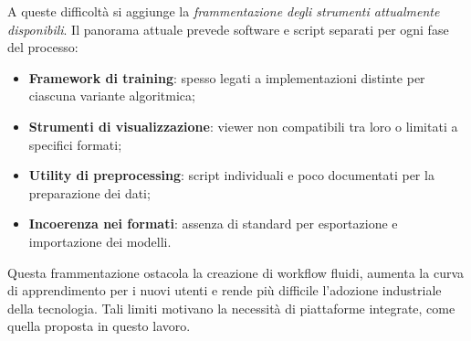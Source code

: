 A queste difficoltà si aggiunge la \textit{frammentazione degli strumenti attualmente disponibili}. Il panorama attuale prevede software e script separati per ogni fase del processo:
\begin{itemize}
    \item \textbf{Framework di training}: spesso legati a implementazioni distinte per ciascuna variante algoritmica;
    \item \textbf{Strumenti di visualizzazione}: viewer non compatibili tra loro o limitati a specifici formati;
    \item \textbf{Utility di preprocessing}: script individuali e poco documentati per la preparazione dei dati;
    \item \textbf{Incoerenza nei formati}: assenza di standard per esportazione e importazione dei modelli.
\end{itemize}

Questa frammentazione ostacola la creazione di workflow fluidi, aumenta la curva di apprendimento per i nuovi utenti e rende più difficile l’adozione industriale della tecnologia. Tali limiti motivano la necessità di piattaforme integrate, come quella proposta in questo lavoro.